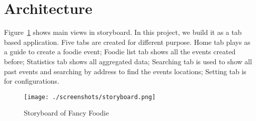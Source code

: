 \newpage
\section{Architecture} %
\label{sec:architecture}

	Figure~\ref{fig:storyboard} shows main views in storyboard. In this project, we build it as a tab based application. Five tabs are created for different purpose. Home tab plays as a guide to create a foodie event; Foodie list tab shows all the events created before; Statistics tab shows all aggregated data; Searching tab is used to show all past events and searching by address to find the events locations; Setting tab is for configurations.
	
\begin{figure}
	\centering
    {\texttt{[image: ./screenshots/storyboard.png]}}
    \caption{Storyboard of Fancy Foodie}
	\label{fig:storyboard}
\end{figure}



